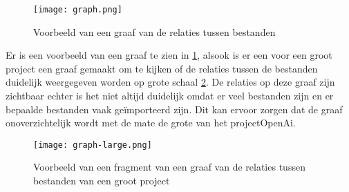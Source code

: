 \begin{figure}[h]
    \centering
    \texttt{[image: graph.png]}
    \caption{Voorbeeld van een graaf van de relaties tussen bestanden}
    \label{fig:graph}
\end{figure}

Er is een voorbeeld van een graaf te zien in \ref{fig:graph}, alsook is er een voor een groot project een graaf gemaakt om te kijken of de relaties tussen de bestanden duidelijk weergegeven worden op grote schaal \ref{fig:graph-large}.
De relaties op deze graaf zijn zichtbaar echter is het niet altijd duidelijk omdat er veel bestanden zijn en er bepaalde bestanden vaak geïmporteerd zijn.
Dit kan ervoor zorgen dat de graaf onoverzichtelijk wordt met de mate de grote van het projectOpenAi.

\begin{figure}[h]
    \centering
    \texttt{[image: graph-large.png]}
    \caption{Voorbeeld van een fragment van een graaf van de relaties tussen bestanden van een groot project}
    \label{fig:graph-large}
\end{figure}